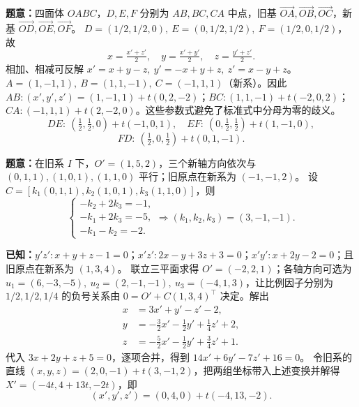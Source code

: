 \textbf{题意：}四面体 $OABC$，$D,E,F$ 分别为 $AB,BC,CA$ 中点，旧基 $\overrightarrow{OA},\overrightarrow{OB},\overrightarrow{OC}$，新基 $\overrightarrow{OD},\overrightarrow{OE},\overrightarrow{OF}$。
 $D=(1/2,1/2,0),\ E=(0,1/2,1/2),\ F=(1/2,0,1/2)$，故
\[
x=\tfrac{x'+z'}2,\quad y=\tfrac{x'+y'}2,\quad z=\tfrac{y'+z'}2.
\]
相加、相减可反解 $x'=x+y-z,\ y'=-x+y+z,\ z'=x-y+z$。
 $A=(1,-1,1),\ B=(1,1,-1),\ C=(-1,1,1)$（新系）。因此 $AB:(x',y',z')=(1,-1,1)+t(0,2,-2)$；$BC:(1,1,-1)+t(-2,0,2)$；$CA:(-1,1,1)+t(2,-2,0)$。这些参数式避免了标准式中分母为零的歧义。
\[
DE:\ (\tfrac12,\tfrac12,0)+t(-1,0,1),\quad
EF:\ (0,\tfrac12,\tfrac12)+t(1,-1,0),
\]
\[
FD:\ (\tfrac12,0,\tfrac12)+t(0,1,-1).
\]

\textbf{题意：}在旧系 $I$ 下，$O'=(1,5,2)$，三个新轴方向依次与 $(0,1,1),(1,0,1),(1,1,0)$ 平行；旧原点在新系为 $(-1,-1,2)$。
设 $C=[k_1(0,1,1),k_2(1,0,1),k_3(1,1,0)]$，则
\[
\begin{cases}-k_2+2k_3=-1,\\-k_1+2k_3=-5,\\-k_1-k_2=-2.\end{cases}
\Longrightarrow (k_1,k_2,k_3)=(3,-1,-1).
\]

\textbf{已知：}$y'z':x+y+z-1=0$；$x'z':2x-y+3z+3=0$；$x'y':x+2y-2=0$；且旧原点在新系为 $(1,3,4)$。
联立三平面求得 $O'=(-2,2,1)$；各轴方向可选为 $u_1=(6,-3,-5),\ u_2=(2,-1,-1),\ u_3=(-4,1,3)$，让比例因子分别为 $1/2,1/2,1/4$ 的负号关系由 $0=O'+C(1,3,4)^\top$ 决定。解出
\[
\boxed{\begin{aligned}
x&=3x'+y'-z'-2,\\
y&=-\tfrac32x'-\tfrac12y'+\tfrac14z'+2,\\
z&=-\tfrac52x'-\tfrac12y'+\tfrac34z'+1.
\end{aligned}}
\]
 代入 $3x+2y+z+5=0$，逐项合并，得到 $14x'+6y'-7z'+16=0$。
 令旧系的直线 $(x,y,z)=(2,0,-1)+t(3,-1,2)$，把两组坐标带入上述变换并解得 $X'=(-4t,4+13t,-2t)$，即
\[\boxed{(x',y',z')=(0,4,0)+t(-4,13,-2).}\]


